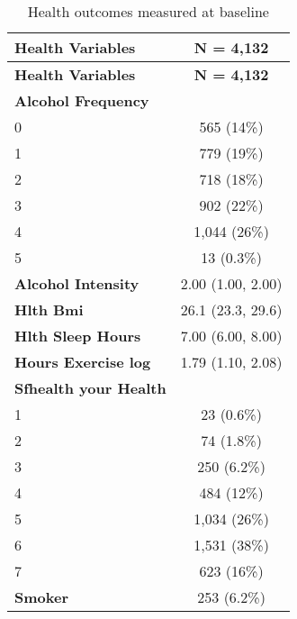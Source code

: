 \documentclass[
  singlecolumn,
  9pt]{article}
\begin{document}
\hypertarget{tbl-table_health_vars_dogs}{}
\begin{longtable}[]{@{}lc@{}}
\caption{\label{tbl-table_health_vars_dogs}Health outcomes measured at
baseline}\tabularnewline
\toprule\noalign{}
\textbf{Health Variables} & \textbf{N = 4,132} \\
\midrule\noalign{}
\endfirsthead
\toprule\noalign{}
\textbf{Health Variables} & \textbf{N = 4,132} \\
\midrule\noalign{}
\endhead
\bottomrule\noalign{}
\endlastfoot
\textbf{Alcohol Frequency} & \\
0 & 565 (14\%) \\
1 & 779 (19\%) \\
2 & 718 (18\%) \\
3 & 902 (22\%) \\
4 & 1,044 (26\%) \\
5 & 13 (0.3\%) \\
\textbf{Alcohol Intensity} & 2.00 (1.00, 2.00) \\
\textbf{Hlth Bmi} & 26.1 (23.3, 29.6) \\
\textbf{Hlth Sleep Hours} & 7.00 (6.00, 8.00) \\
\textbf{Hours Exercise log} & 1.79 (1.10, 2.08) \\
\textbf{Sfhealth your Health} & \\
1 & 23 (0.6\%) \\
2 & 74 (1.8\%) \\
3 & 250 (6.2\%) \\
4 & 484 (12\%) \\
5 & 1,034 (26\%) \\
6 & 1,531 (38\%) \\
7 & 623 (16\%) \\
\textbf{Smoker} & 253 (6.2\%) \\
\end{longtable}
\end{document}
